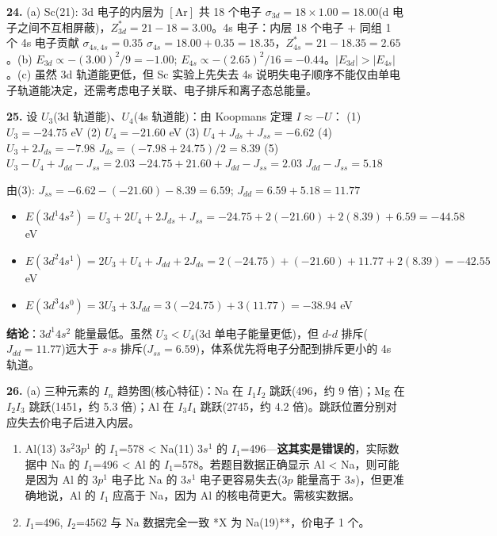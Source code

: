 \textbf{24.} (a) Sc(21): 3d 电子的内层为 \([\mathrm{Ar}]\) 共 18 个电子 \箭 \(\sigma_{3d} = 18 \times 1.00 = 18.00\)(d 电子之间不互相屏蔽)，\(Z^*_{3d} = 21 - 18 = 3.00\)。4s 电子：内层 18 个电子 + 同组 1 个 4s 电子贡献 \(\sigma_{4s,4s} = 0.35\) \箭 \(\sigma_{4s} = 18.00 + 0.35 = 18.35\)，\(Z^*_{4s} = 21 - 18.35 = 2.65\)。(b) \(E_{3d} \propto -(3.00)^2/9 = -1.00\); \(E_{4s} \propto -(2.65)^2/16 = -0.44\)。\(|E_{3d}| > |E_{4s}|\)。(c) 虽然 3d 轨道能更低，但 Sc 实验上先失去 4s \箭 说明失电子顺序不能仅由单电子轨道能决定，还需考虑电子关联、电子排斥和离子态总能量。

\textbf{25.} 设 \(U_3\)(3d 轨道能)、\(U_4\)(4s 轨道能)：由 Koopmans 定理 \(I \approx -U\)：
(1) \(U_3 = -24.75\) eV
(2) \(U_4 = -21.60\) eV
(3) \(U_4 + J_{ds} + J_{ss} = -6.62\)
(4) \(U_3 + 2J_{ds} = -7.98\) \箭 \(J_{ds} = (-7.98 + 24.75)/2 = 8.39\)
(5) \(U_3 - U_4 + J_{dd} - J_{ss} = 2.03\) \箭 \(-24.75+21.60+J_{dd}-J_{ss}=2.03\) \箭 \(J_{dd}-J_{ss}=5.18\)

由(3): \(J_{ss} = -6.62 - (-21.60) - 8.39 = 6.59\); \(J_{dd} = 6.59 + 5.18 = 11.77\)

\begin{itemize}
\tightlist
\item
  \(E(3d^1 4s^2) = U_3 + 2U_4 + 2J_{ds} + J_{ss} = -24.75 + 2(-21.60) + 2(8.39) + 6.59 = -44.58\) eV
\item
  \(E(3d^2 4s^1) = 2U_3 + U_4 + J_{dd} + 2J_{ds} = 2(-24.75) + (-21.60) + 11.77 + 2(8.39) = -42.55\) eV
\item
  \(E(3d^3 4s^0) = 3U_3 + 3J_{dd} = 3(-24.75) + 3(11.77) = -38.94\) eV
\end{itemize}

\textbf{结论}：\(3d^1 4s^2\) 能量最低。虽然 \(U_3 < U_4\)(3d 单电子能量更低)，但 \(d\)-\(d\) 排斥(\(J_{dd}=11.77\))远大于 \(s\)-\(s\) 排斥(\(J_{ss}=6.59\))，体系优先将电子分配到排斥更小的 4s 轨道。

\textbf{26.} (a) 三种元素的 \(I_n\) 趋势图(核心特征)：Na 在 \(I_1\)\箭\(I_2\) 跳跃(496，约 9 倍)；Mg 在 \(I_2\)\箭\(I_3\) 跳跃(1451，约 5.3 倍)；Al 在 \(I_3\)\箭\(I_4\) 跳跃(2745，约 4.2 倍)。跳跃位置分别对应失去价电子后进入内层。

\begin{enumerate}
\def\labelenumi{(\alph{enumi})}
\setcounter{enumi}{1}
\item
  Al(13) \(3s^2 3p^1\) 的 \(I_1\)=578 \textless{} Na(11) \(3s^1\) 的 \(I_1\)=496---\textbf{这其实是错误的}，实际数据中 Na 的 \(I_1\)=496 \textless{} Al 的 \(I_1\)=578。若题目数据正确显示 Al \textless{} Na，则可能是因为 Al 的 \(3p^1\) 电子比 Na 的 \(3s^1\) 电子更容易失去(\(3p\) 能量高于 \(3s\))，但更准确地说，Al 的 \(I_1\) 应高于 Na，因为 Al 的核电荷更大。需核实数据。
\item
  \(I_1\)=496, \(I_2\)=4562 \箭 与 Na 数据完全一致 \箭 **X 为 Na(19)**，价电子 1 个。
\end{enumerate}

